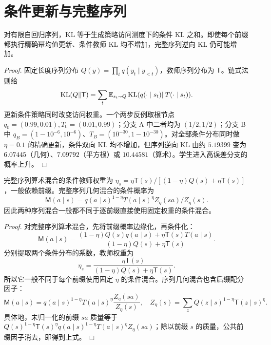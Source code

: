 \section{条件更新与完整序列}
\begin{proposition}[条件改善不保证序列 KL 改善]
对有限自回归序列，KL 等于生成策略访问测度下的条件 KL 之和。即使每个前缀都执行精确幂均值更新、条件教师 KL 均不增加，完整序列逆向 KL 仍可能增加。
\end{proposition}
\begin{proof}
固定长度序列分布 $Q(y)=\prod_tq(y_t\mid y_{<t})$，教师序列分布为 $\mathsf T$。链式法则给
\begin{equation}
\operatorname{KL}(Q\Vert\mathsf T)=\sum_t\mathbb E_{s_t\sim Q}\operatorname{KL}(q(\cdot\mid s_t)\Vert T(\cdot\mid s_t)).
\end{equation}
更新条件策略同时改变访问权重。一个两步反例取根节点 $q_0=(0.99,0.01),T_0=(0.01,0.99)$；分支 A 中二者均为 $(1/2,1/2)$；分支 B 中 $q_B=(1-10^{-6},10^{-6})$、$T_B=(10^{-30},1-10^{-30})$。对全部条件分布同时做 $\eta=0.1$ 的精确更新，条件双向 KL 均不增加，但序列逆向 KL 由约 $5.19399$ 变为 $6.07445$（几何）、$7.09792$（平方根）或 $10.44581$（算术）。学生进入高误差分支的概率上升。
\end{proof}

\begin{proposition}[条件化与序列混合的差异]
完整序列算术混合的条件教师权重为 $\eta_s=\eta\mathsf T(s)/[(1-\eta)Q(s)+\eta\mathsf T(s)]$，一般依赖前缀。完整序列几何混合的条件概率为
\begin{equation}
\mathsf M(a\mid s)=q(a\mid s)^{1-\eta}T(a\mid s)^\eta Z_\eta(sa)/Z_\eta(s).
\end{equation}
因此两种序列混合一般都不同于逐前缀直接使用固定权重的条件混合。
\end{proposition}
\begin{proof}
对完整序列算术混合，先将前缀概率边缘化，再条件化：
\begin{equation}
\mathsf M(a\mid s)
=\frac{(1-\eta)Q(s)q(a\mid s)+\eta\mathsf T(s)T(a\mid s)}
{(1-\eta)Q(s)+\eta\mathsf T(s)}.
\end{equation}
分别提取两个条件分布的系数，教师权重为
\begin{equation}
\eta_s=\frac{\eta\mathsf T(s)}{(1-\eta)Q(s)+\eta\mathsf T(s)}.
\end{equation}
所以它一般不同于每个前缀使用固定 $\eta$ 的条件混合。序列几何混合也含后缀配分因子：
\begin{equation}
\mathsf M(a\mid s)=q(a\mid s)^{1-\eta}T(a\mid s)^\eta
\frac{Z_\eta(sa)}{Z_\eta(s)},\quad
Z_\eta(s)=\sum_zQ(z\mid s)^{1-\eta}\mathsf T(z\mid s)^\eta.
\end{equation}
具体地，未归一化的前缀 $sa$ 质量等于 $Q(s)^{1-\eta}\mathsf T(s)^\eta q(a\mid s)^{1-\eta}T(a\mid s)^\eta Z_\eta(sa)$；除以前缀 $s$ 的质量，公共前缀因子消去，即得到上式。
\end{proof}

